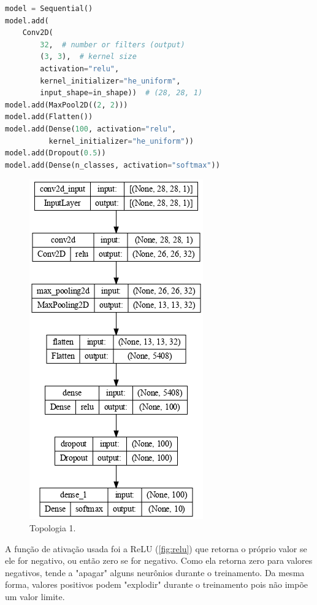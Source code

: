 \documentclass[sigconf, nonacm, screen]{acmart}
\begin{document}
\begin{lstlisting}[language=Python,label=lst:topo1,caption={Topologia 1 - definição das camadas da rede neural artificial.}]
model = Sequential()
model.add(
    Conv2D(
        32,  # number or filters (output)
        (3, 3),  # kernel size
        activation="relu",
        kernel_initializer="he_uniform",
        input_shape=in_shape))  # (28, 28, 1)
model.add(MaxPool2D((2, 2)))
model.add(Flatten())
model.add(Dense(100, activation="relu",
          kernel_initializer="he_uniform"))
model.add(Dropout(0.5))
model.add(Dense(n_classes, activation="softmax"))
\end{lstlisting}

\begin{figure}[ht]
	\centering
	\includegraphics[width=0.6\linewidth]{img/topo1}
	\caption{Topologia 1.}
	\label{fig:topo}
\end{figure}

A função de ativação usada foi a ReLU (\autoref{fig:relu}) que retorna o próprio valor se ele for negativo, ou então zero se for negativo. Como ela retorna zero para valores negativos, tende a "apagar" alguns neurônios durante o treinamento. Da mesma forma, valores positivos podem "explodir" durante o treinamento pois não impõe um valor limite.
\end{document}
